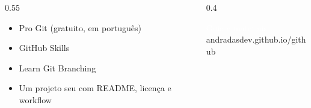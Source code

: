 \begin{frame}{}
  \vspace{0.3em}
  \begin{columns}[c]
    \begin{column}{0.55\textwidth}
      \begin{itemize}
        \item[] {\small Pro Git (gratuito, em português)}
        \item[] {\small GitHub Skills}
        \item[] {\small Learn Git Branching}
      \end{itemize}
      \vspace{.6em}
      \begin{itemize}
        \item[] {\small Um projeto seu com README, licença e workflow}
      \end{itemize}
    \end{column}
    \begin{column}{0.4\textwidth}
      \begin{center}

        \vspace{0.5em}
        {\lexendsemibold\footnotesize\textcolor{white}{Guia e materiais}}\\[.15em]
        {\lexendlight\scriptsize\textcolor{lightpurple}{andradasdev.github.io/github}}
      \end{center}
    \end{column}
  \end{columns}

\end{frame}

